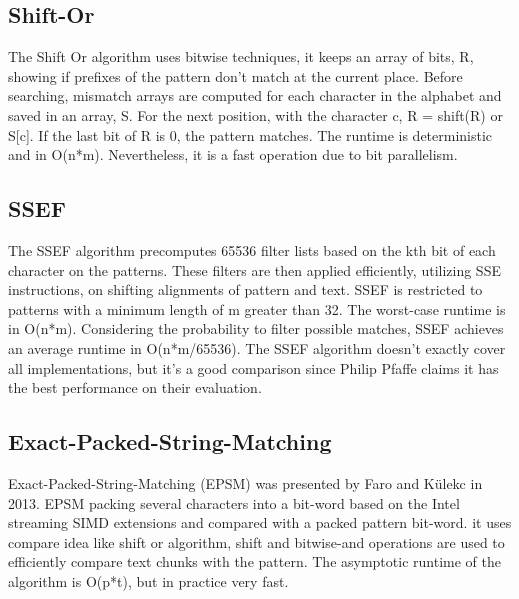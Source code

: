 \documentclass[11pt]{article}       %
\newcommand{\includeFig}[3]      {\begin{figure}[htb] \begin{center}
                                 \includegraphics
                                 [width=4in,keepaspectratio] %
                                 {#2}\caption{\label{#1}#3} \end{center} \end{figure}}
\begin{document}
\subsection{Shift-Or}\label{so}
The Shift Or algorithm uses bitwise techniques\cite{Matching}, it keeps an array of bits, R, showing if prefixes of the pattern don't match at the current place. Before searching, mismatch arrays are computed for each character in the alphabet and saved in an array, S. For the next position, with the character c, R = shift(R) or S[c]. If the last bit of R is 0, the pattern matches. The runtime is deterministic and in O(n*m). Nevertheless, it is a fast operation due to bit parallelism.

\subsection{SSEF}\label{SSEF}
The SSEF algorithm precomputes 65536 filter lists based on the kth bit of each character on the patterns\cite{Matching}. These filters are then applied efficiently, utilizing SSE instructions, on shifting alignments of pattern and text. SSEF is restricted to patterns with a minimum length of m greater than 32. The worst-case runtime is in O(n*m). Considering the probability to filter possible matches, SSEF achieves an average runtime in O(n*m/65536). The SSEF algorithm doesn't exactly cover all implementations, but it's a good comparison since Philip Pfaffe claims it has the best performance on their evaluation\cite{SSEF}.

\subsection{Exact-Packed-String-Matching}\label{EPSM}
Exact-Packed-String-Matching (EPSM) was presented by Faro and Külekc in 2013\cite{EPSM}. EPSM packing several characters into a bit-word based on the Intel streaming SIMD extensions and compared with a packed pattern bit-word. it uses compare idea like shift or algorithm, shift and bitwise-and operations are used to efficiently compare text chunks with the pattern. The asymptotic runtime of the algorithm is O(p*t), but in practice very fast.



\end{document}
